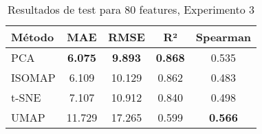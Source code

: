\begin{table}[h]
\centering
\begin{tabular}{lcccc}
\toprule
\textbf{Método} & \textbf{MAE} & \textbf{RMSE} & \textbf{R²} & \textbf{Spearman} \\
\midrule
PCA & \textbf{6.075} & \textbf{9.893} & \textbf{0.868} & 0.535 \\
ISOMAP & 6.109 & 10.129 & 0.862 & 0.483 \\
t-SNE & 7.107 & 10.912 & 0.840 & 0.498 \\
UMAP & 11.729 & 17.265 & 0.599 & \textbf{0.566} \\
\bottomrule
\end{tabular}
\caption{Resultados de test para 80 features, Experimento 3}
\label{tab:test_results_80feat_exp3}
\end{table}
